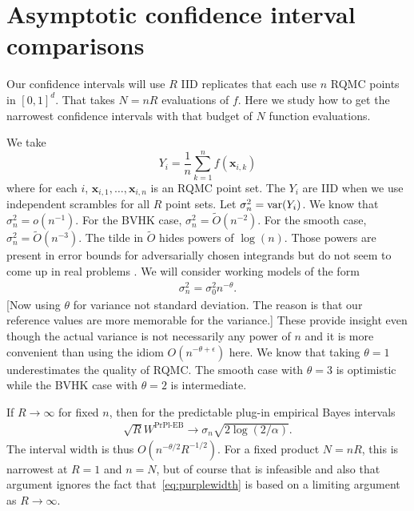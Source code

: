 \documentclass{article}
\newcommand{\art}[1]{\begingroup\color{blue}#1\endgroup}
\newcommand{\e}{\mathbb{E}}
\newcommand{\bsx}{\boldsymbol{x}}
\newcommand{\giv}{\!\mid\!} %
\newcommand{\prpleb}{\text{PrPl-EB}}
\begin{document}

\section{Asymptotic confidence interval comparisons}\label{sec:asymptotic}

Our confidence intervals will use $R$ IID replicates that each
use $n$ RQMC points in $[0,1]^d$.  That takes $N=nR$
evaluations of $f$. 
Here we study how to get the narrowest confidence
intervals with that budget of $N$ function evaluations.

We take 
$$Y_i=\frac1n\sum_{k=1}^nf(\bsx_{i,k})$$
where for each $i$, $\bsx_{i,1},\dots,\bsx_{i,n}$ is an RQMC
point set. The $Y_i$ are IID when we use independent
scrambles for all $R$ point sets. Let $\sigma^2_n = \operatorname{var}(Y_i)$.
We know that $\sigma^2_n = o(n^{-1}).$
For the BVHK case, $\sigma^2_n=\tilde O(n^{-2})$.  
For the smooth case,
$\sigma^2_n=\tilde O(n^{-3})$.  
The tilde in $\tilde O$ hides powers of $\log(n)$.
Those powers are present in error bounds for adversarially
chosen integrands but do not seem to come up in
real problems \cite{schl:2002,wherearethelogs}.
We will consider working
models of the form
\begin{align}\label{eq:themodel}
\sigma^2_n = \sigma^2_0n^{-\theta}.
\end{align}
\art{[Now using $\theta$ for variance not standard deviation.
The reason is that our reference values are more memorable
for the variance.]}
These provide insight even though the actual variance is not
necessarily any power of $n$ and it is more convenient
than using the idiom $O(n^{-\theta+\epsilon})$ here.
We know that taking $\theta=1$ underestimates
the quality of RQMC. The smooth case with $\theta = 3$ is optimistic
while the BVHK case with $\theta=2$ is intermediate.

If $R\to\infty$ for fixed $n$, then for the predictable
plug-in empirical Bayes intervals
\begin{align}\label{eq:purplewidth}
\sqrt{R}W^\prpleb\to \sigma_n\sqrt{2\log(2/\alpha)}.
\end{align}
The interval width is thus $O(n^{-\theta/2}R^{-1/2})$.
For a fixed product $N=nR$, this is narrowest at $R=1$
and $n=N$, but of course that is infeasible and also
that argument ignores the fact that~\eqref{eq:purplewidth}
is based on a limiting argument as $R\to\infty$.
\end{document}
